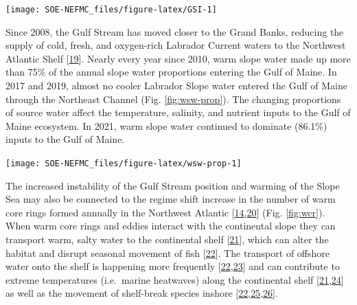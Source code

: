 \documentclass[
  10pt,
]{article}
\let\origfigure\figure
\let\endorigfigure\endfigure
\renewenvironment{figure}[1][2] {
    \expandafter\origfigure\expandafter[H]
} {
    \endorigfigure
}
\begin{document}
\begin{figure}

{\centering \texttt{[image: SOE-NEFMC\_files/figure-latex/GSI-1]} 

}

\caption{Index representing changes in the location of the Gulf Stream north wall. Positive values represent a more northerly Gulf Stream position.}\label{fig:GSI}
\end{figure}

Since 2008, the Gulf Stream has moved closer to the Grand Banks, reducing the supply of cold, fresh, and oxygen-rich Labrador Current waters to the Northwest Atlantic Shelf {[}\protect\hyperlink{ref-goncalves_neto_changes_2021}{19}{]}. Nearly every year since 2010, warm slope water made up more than 75\% of the annual slope water proportions entering the Gulf of Maine. In 2017 and 2019, almost no cooler Labrador Slope water entered the Gulf of Maine through the Northeast Channel (Fig. \ref{fig:wsw-prop}). The changing proportions of source water affect the temperature, salinity, and nutrient inputs to the Gulf of Maine ecosystem. In 2021, warm slope water continued to dominate (86.1\%) inputs to the Gulf of Maine.

\begin{figure}

{\centering \texttt{[image: SOE-NEFMC\_files/figure-latex/wsw-prop-1]} 

}

\caption{Proportion of Warm Slope Water (WSW) and Labrador slope water (LSLW) entering the GOM through the Northeast Channel.}\label{fig:wsw-prop}
\end{figure}

The increased instability of the Gulf Stream position and warming of the Slope Sea may also be connected to the regime shift increase in the number of warm core rings formed annually in the Northwest Atlantic {[}\protect\hyperlink{ref-gangopadhyay_census_2020}{14},\protect\hyperlink{ref-gangopadhyay_observed_2019}{20}{]} (Fig. \ref{fig:wcr}). When warm core rings and eddies interact with the continental slope they can transport warm, salty water to the continental shelf {[}\protect\hyperlink{ref-chen_mesoscale_2022}{21}{]}, which can alter the habitat and disrupt seasonal movement of fish {[}\protect\hyperlink{ref-gawarkiewicz_changing_2018}{22}{]}. The transport of offshore water onto the shelf is happening more frequently {[}\protect\hyperlink{ref-gawarkiewicz_changing_2018}{22},\protect\hyperlink{ref-gawarkiewicz_increasing_nodate}{23}{]} and can contribute to extreme temperatures (i.e.~marine heatwaves) along the continental shelf {[}\protect\hyperlink{ref-chen_mesoscale_2022}{21},\protect\hyperlink{ref-gawarkiewicz_characteristics_2019}{24}{]} as well as the movement of shelf-break species inshore {[}\protect\hyperlink{ref-gawarkiewicz_changing_2018}{22},\protect\hyperlink{ref-potter_horizontal_2011}{25},\protect\hyperlink{ref-worm_predator_2003}{26}{]}.
\end{document}
